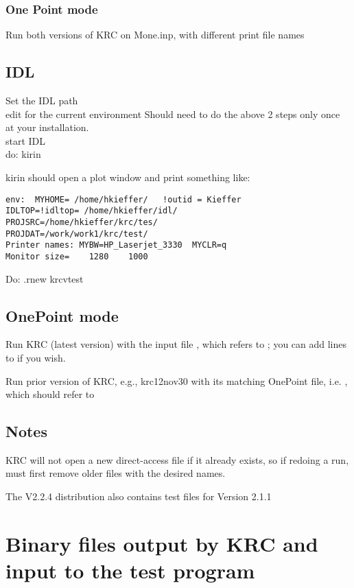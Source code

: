 \documentclass{article}  %
\begin{document}
\subsubsection{One Point mode} %

Run both versions of KRC on Mone.inp, with different print file names

\subsection{IDL} 
Set the IDL path
\\ edit  for the current environment
\qi  Should need to do the above 2 steps only once at your installation.
\\ start IDL
\\ do:  kirin

kirin should open a plot window and print something like:
\vspace{-3.mm} 
\begin{verbatim}
env:  MYHOME= /home/hkieffer/   !outid = Kieffer
IDLTOP=!idltop= /home/hkieffer/idl/
PROJSRC=/home/hkieffer/krc/tes/
PROJDAT=/work/work1/krc/test/
Printer names: MYBW=HP_Laserjet_3330  MYCLR=q
Monitor size=    1280    1000
\end{verbatim}

Do: .rnew krcvtest

\subsection{OnePoint mode} %
Run KRC (latest version) with the input file , which refers to ; you can add lines to   if you wish.

Run prior version of KRC, e.g.,  krc12nov30 with its matching OnePoint file, i.e.  , which should refer to  

\subsection{Notes} %

KRC will not open a new direct-access file if it already exists, so if redoing a run, must first remove older files with the desired names.

The V2.2.4 distribution also contains test files for Version 2.1.1
\section{Binary files output by KRC and input to the test program \label{finput}} %
\end{document}
